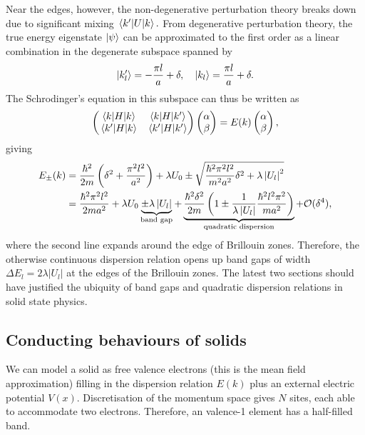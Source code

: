 \documentclass{article}
\theoremstyle{nonumberplain}
\begin{document}
Near the edges, however, the non-degenerative perturbation theory breaks down due to significant mixing $\mel{k^\prime }{U}{k}.$ From degenerative perturbation theory, the true energy eigenstate $\ket{\psi }$ can be approximated to the first order as a linear combination in the degenerate subspace spanned by
\[
    \ket{k_l^\prime } = -\frac{\pi  l}{a} + \delta , \quad 
    \ket{k_l} = \frac{\pi  l}{a} + \delta. 
\] 
The Schrodinger's equation in this subspace can thus be written as
\[
    \begin{pmatrix}
        \mel{k}{H}{k} & \mel{k}{H}{k^\prime } \\
        \mel{k^\prime }{H}{k} & \mel{k^\prime }{H}{k^\prime }
    \end{pmatrix}
    \begin{pmatrix}
        \alpha \\ 
        \beta 
    \end{pmatrix} 
    = 
    E(k) 
    \begin{pmatrix}
        \alpha \\ 
        \beta 
    \end{pmatrix},
\]
giving 
\[
    \begin{aligned}
        E_{\pm} (k) 
    &=  \frac{\hbar ^{2} }{2 m} \left(\delta ^{2} + \frac{\pi ^{2} l^{2} }{a^{2} }\right) + \lambda U_0 \pm
    \sqrt{\frac{\hbar ^{2} \pi ^{2} l^{2} }{m^{2} a^{2} }\delta ^{2} + \lambda \left\vert U_l \right\vert ^{2} } \\
    &= {\frac{\hbar ^{2} \pi ^{2} l^{2} }{2ma^{2} } + \lambda  U_0} \underbrace{\pm\lambda \left\vert U_l \right\vert}_{\text{band gap}}
    + \underbrace{\frac{\hbar ^{2} \delta ^{2} }{2m}\left( 1 \pm \frac{1}{\lambda \left\vert U_l \right\vert } \frac{\hbar ^{2} l^{2} \pi ^{2} }{ma^{2} }\right)}_{\text{quadratic dispersion}} + \mathcal{\MakeUppercase{O}} (\delta ^{4} ), 
    \end{aligned}
\]
where the second line expands around the edge of Brillouin zones. Therefore, the otherwise continuous dispersion relation opens up band gaps of width $\boxed{\Delta E_l = 2 \lambda \left\vert U_l \right\vert} $ at the edges of the Brillouin zones. The latest two sections should have justified the ubiquity of band gaps and quadratic dispersion relations in solid state physics. 

\subsection{Conducting behaviours of solids}
We can model a solid as free valence electrons (this is the mean field approximation) filling in the dispersion relation $E(k)$ plus an external electric potential $V(x).$ Discretisation of the momentum space gives $N$ sites, each able to accommodate two electrons. Therefore, an valence-1 element has a half-filled band. 
\end{document}
